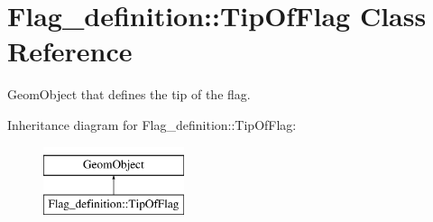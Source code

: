 \hypertarget{classFlag__definition_1_1TipOfFlag}{}\section{Flag\+\_\+definition\+:\+:Tip\+Of\+Flag Class Reference}
\label{classFlag__definition_1_1TipOfFlag}


Geom\+Object that defines the tip of the flag.  


Inheritance diagram for Flag\+\_\+definition\+:\+:Tip\+Of\+Flag\+:\begin{figure}[H]
\begin{center}
\leavevmode
\includegraphics[height=2.000000cm]{classFlag__definition_1_1TipOfFlag}
\end{center}
\end{figure}
